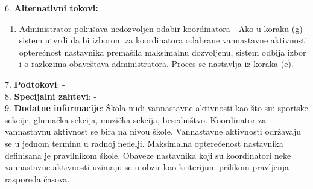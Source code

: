 \documentclass{article}
\begin{document}
6. \textbf{Alternativni tokovi:}
\begin{enumerate} [label=(\roman*)]
    \item Administrator pokušava nedozvoljen odabir koordinatora - Ako u koraku (g) sistem utvrdi da bi izborom za koordinatora odabrane vannastavne aktivnosti opterećnost nastavnika premašila maksimalnu dozvoljenu, sistem odbija izbor i o razlozima obaveštava administratora. Proces se nastavlja iz koraka (e).
\end{enumerate}

7. \textbf{Podtokovi}: - \\

8. \textbf{Specijalni zahtevi}: - \\

9. \textbf{Dodatne informacije}: Škola nudi vannastavne aktivnosti kao što su: sportske sekcije, glumačka sekcija, muzička sekcija, besedništvo. Koordinator za vannastavnu aktivnost se bira na nivou škole. Vannastavne aktivnosti održavaju se u jednom terminu u radnoj nedelji. Maksimalna opterećenost nastavnika definisana je pravilnikom škole. Obaveze nastavnika koji su koordinatori neke vannastavne aktivnosti uzimaju se u obzir kao kriterijum prilikom pravljenja rasporeda časova. \\
\end{document}
